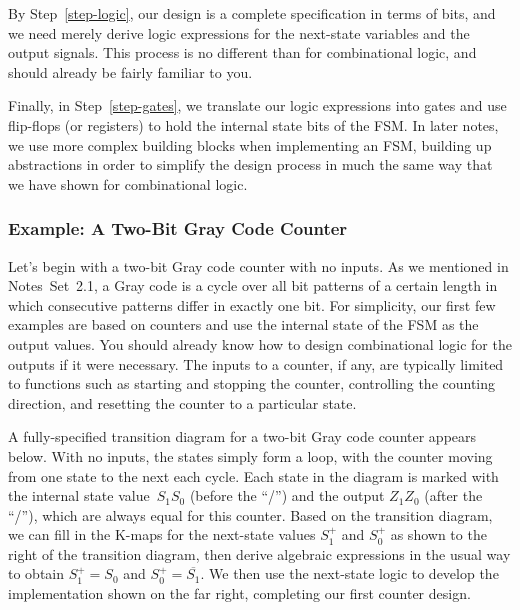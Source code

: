 By Step~\ref{step-logic}, our design is a complete specification in
terms of bits, and we need merely derive logic expressions for the
next-state variables and the output signals.  This process is no
different than for combinational logic, and should already be fairly 
familiar to you.

\pagebreak

Finally, in Step~\ref{step-gates}, we translate our logic expressions
into gates and use flip-flops (or registers) to hold the internal
state bits of the FSM.  In later notes, we use more complex
building blocks when implementing an FSM, building up abstractions
in order to simplify the design process in much the same way that
we have shown for combinational logic.\\


\subsubsection{Example: A Two-Bit Gray Code Counter}

Let's begin with a two-bit Gray code counter with no inputs.
As we mentioned in Notes~Set~2.1, a Gray code is a cycle over all
bit patterns of a certain length in which consecutive patterns differ
in exactly one bit.
%
For simplicity, our first few examples are based on counters and
use the internal state
of the FSM as the output values.  You should already know
how to design combinational logic for the outputs if it were necessary.
%
The inputs to a counter, if any, are typically limited to functions
such as starting and stopping the counter, controlling the counting 
direction, and resetting the counter to a particular state.

A fully-specified transition diagram for 
a two-bit Gray code counter appears below.
With no inputs, the states simply form a loop, with
the counter moving from one state to the next each cycle.
%
Each state in the diagram is marked with the internal state value~$S_1S_0$ 
(before the ``/'') and the output $Z_1Z_0$ (after the ``/''), which are 
always equal for this counter.
%
Based on the transition diagram, we can fill in the K-maps for the 
next-state values $S_1^+$ and $S_0^+$ as shown to the right of the
transition diagram, then 
derive algebraic expressions in the usual way to obtain
$S_1^+=S_0$ and $S_0^+=\overline{\mbox{$S_1$}}$.
%
We then use the next-state logic to develop the implementation
shown on the far right, completing our first counter design.

